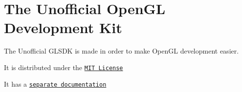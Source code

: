 \hypertarget{group__module__glsdk}{\section{The Unofficial Open\-G\-L Development Kit}
\label{group__module__glsdk}
}
The Unofficial G\-L\-S\-D\-K is made in order to make Open\-G\-L development easier.

It is distributed under the \href{http://www.opensource.org/licenses/MIT}{\tt M\-I\-T License}

It has a \href{http://glsdk.sourceforge.net/docs/html/index.html}{\tt separate documentation} 